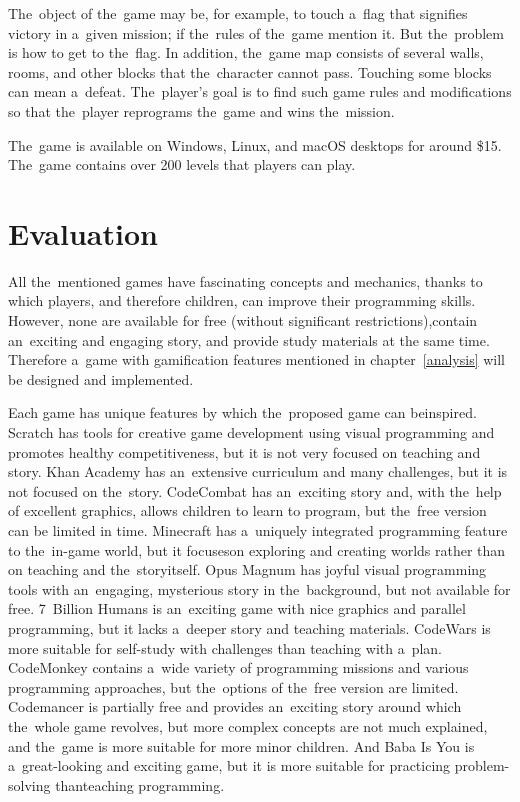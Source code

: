 The~object of the~game may be, for example, to touch a~flag that signifies victory in a~given mission; if the~rules of the~game mention it.
But the~problem is how to get to the~flag.
In addition, the~game map consists of several walls, rooms, and other blocks that the~character cannot pass.
Touching some blocks can mean a~defeat.
The~player's goal is to find such game rules and modifications so that the~player reprograms the~game and wins the~mission.

The~game is available on Windows, Linux, and macOS desktops for around \$15.
The~game contains over 200 levels that players can play.

\section{Evaluation}

All the~mentioned games have fascinating concepts and mechanics, thanks to which players, and therefore children, can improve their programming skills.
However, none are available for free (without significant restrictions),\linebreak{}contain an~exciting and engaging story, and provide study materials at the same time.
Therefore a~game with gamification features mentioned in chapter~\ref{analysis} will be designed and implemented.

Each game has unique features by which the~proposed game can be\linebreak{}inspired.
Scratch has tools for creative game development using visual programming and promotes healthy competitiveness, but it is not very focused on teaching and story.
Khan Academy has an~extensive curriculum and many challenges, but it is not focused on the~story.
CodeCombat has an~exciting story and, with the~help of excellent graphics, allows children to learn to program, but the~free version can be limited in time.
Minecraft has a~uniquely integrated programming feature to the~in-game world, but it focuses\linebreak{}on exploring and creating worlds rather than on teaching and the~story\linebreak{}itself.
Opus Magnum has joyful visual programming tools with an~engaging, mysterious story in the~background, but not available for free.
7~\mbox{Billion} \mbox{Humans} is an~exciting game with nice graphics and parallel programming, but it lacks a~deeper story and teaching materials.
CodeWars is more suitable for self-study with challenges than teaching with a~plan.
\mbox{CodeMonkey} contains a~wide variety of programming missions and various programming approaches, but the~options of the~free version are limited.
Codemancer is partially free and provides an~exciting story around which the~whole game revolves, but more complex concepts are not much explained, and the~game is more suitable for more minor children.
And Baba Is You is a~great-looking and exciting game, but it is more suitable for practicing problem-solving than\linebreak{}teaching programming.

